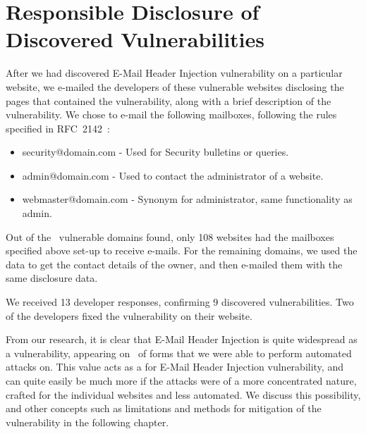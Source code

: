 \section[Responsible Disclosure]{Responsible Disclosure of Discovered Vulnerabilities}
After we had discovered E-Mail Header Injection vulnerability on a particular website, we e-mailed the developers of these vulnerable websites disclosing the pages that contained the vulnerability, along with a brief description of the vulnerability.
We chose to e-mail the following mailboxes, following the rules specified in RFC~2142~\cite{rfc2142}:
\begin{itemize}
	\item security@domain.com - Used for Security bulletins or queries.
	\item admin@domain.com - Used to contact the administrator of a website.
	\item webmaster@domain.com - Synonym for administrator, same functionality as admin.
\end{itemize}

Out of the \domains\ vulnerable domains found, only 108 websites had the mailboxes specified above set-up to receive e-mails. For the remaining domains, we used the  \cite{whois} data to get the contact details of the owner, and then e-mailed them with the same disclosure data.

We received 13 developer responses, confirming 9 discovered vulnerabilities. Two of the developers fixed the vulnerability on their website.

From our research, it is clear that E-Mail Header Injection is quite widespread as a vulnerability, appearing on \successDelta\ of forms that we were able to perform automated attacks on. This value acts as a  for E-Mail Header Injection vulnerability, and can quite easily be much more if the attacks were of a more concentrated nature, crafted for the individual websites and less automated. We discuss this possibility, and other concepts such as limitations and methods for mitigation of the vulnerability in the following chapter.